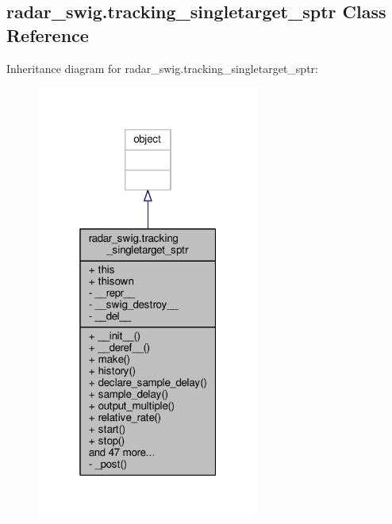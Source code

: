 \subsection{radar\+\_\+swig.\+tracking\+\_\+singletarget\+\_\+sptr Class Reference}
\label{classradar__swig_1_1tracking__singletarget__sptr}


Inheritance diagram for radar\+\_\+swig.\+tracking\+\_\+singletarget\+\_\+sptr\+:
\nopagebreak
\begin{figure}[H]
\begin{center}
\leavevmode
\includegraphics[width=208pt]{d1/da9/classradar__swig_1_1tracking__singletarget__sptr__inherit__graph}
\end{center}
\end{figure}


